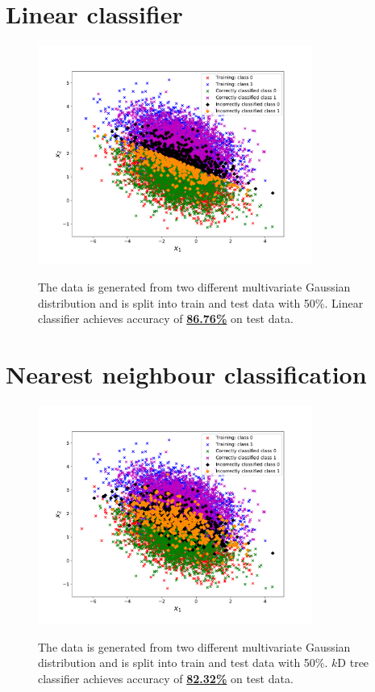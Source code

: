\documentclass{article}
\begin{document}
\newpage
\section{Linear classifier}
\begin{figure}[htbp]
\centering
{\includegraphics[width=0.8\textwidth]{figures/linear_classifier.pdf}}
\caption{The data is generated from two different multivariate Gaussian distribution and is split into train and test data with 50\%. Linear classifier achieves accuracy of \underline{\textbf{86.76\%}} on test data.}
\label{fig:lin_classifier_1}
\end{figure}

\newpage
\section{Nearest neighbour classification}
\begin{figure}[htbp]
\centering
{\includegraphics[width=0.8\textwidth]{figures/kdtree_classifier.pdf}}
\caption{The data is generated from two different multivariate Gaussian distribution and is split into train and test data with 50\%. $k$D tree classifier achieves accuracy of \underline{\textbf{82.32\%}} on test data.}
\label{fig:kdtree_classifier_1}
\end{figure}
\end{document}
